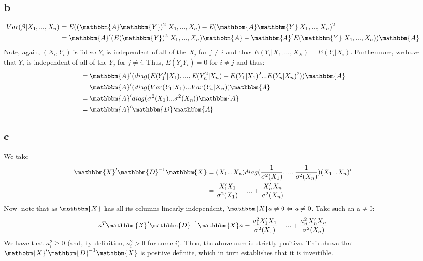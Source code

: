 \documentclass[12pt]{paper}
\begin{document}
\subsection*{b}
\begin{align*}
    Var(\tilde \beta | X_1,...,X_n) & = E((\mathbbm{A} \mathbbm{Y})^2|X_1,...,X_n ) - E(\mathbbm{A} \mathbbm{Y}|X_1,...,X_n )^2 \\
&= \mathbbm{A}'(E( \mathbbm{Y})^2|X_1,...,X_n )\mathbbm{A} - \mathbbm{A}'E( \mathbbm{Y}|X_1,...,X_n )) \mathbbm{A} \\
\end{align*}
Note, again, $(X_i,Y_i)$ is iid so $Y_i$ is independent of all of the $X_j$ for $j \neq i$ and thus $E(Y_i|X_1,...,X_N) = E(Y_i|X_i)$. Furthermore, we have that $Y_i$ is
independent of all of the $Y_j$ for $j \neq i$. Thus, $E(Y_jY_i) = 0$ for $i \neq j$ and thus:
\begin{align*}
&= \mathbbm{A}'(diag(E( Y_1^2|X_1 ),...,E( Y_n^2|X_n ) - E( Y_1|X_ 1)^2...E( Y_n|X_n )^2)) \mathbbm{A} \\
&= \mathbbm{A}'(diag(Var( Y_1|X_1 )...Var( Y_n|X_n )) \mathbbm{A} \\
& = \mathbbm{A}'diag(\sigma^2(X_1 )...\sigma^2(X_n )) \mathbbm{A} \\ 
& = \mathbbm{A}'\mathbbm{D} \mathbbm{A}
\end{align*}

\subsection*{c}
We take
\begin{align*}
    \mathbbm{X}' \mathbbm{D}^{-1} \mathbbm{X} &= (X_1 ... X_n) diag(\frac{1}{\sigma^2(X_1)},...,\frac{1}{\sigma^2(X_n)})(X_1 ... X_n)'\\
    & =\frac{X_1'X_1}{\sigma^2(X_1)}+...+\frac{X_n'X_n}{\sigma^2(X_n)} \\
\end{align*}
Now, note that as $\mathbbm{X}$ has all its columns linearly independent, $\mathbbm{X}a \neq 0 \Leftrightarrow a \neq 0$. 
Take such an a$\neq 0$: 
\begin{align*}
    a^T \mathbbm{X}' \mathbbm{D}^{-1} \mathbbm{X}a &= \frac{a^2_1X_1'X_1}{\sigma^2(X_1)}+...+\frac{a^2_nX_n'X_n}{\sigma^2(X_n)} \\
\end{align*}
We have that $a_i^2\geq 0$ (and, by definition, $a_i^2>0$ for some $i$). Thus, the above sum is strictly positive. This shows that $\mathbbm{X}' \mathbbm{D}^{-1} \mathbbm{X}$ is positive definite, which in turn establishes that it is invertible.
\end{document}
